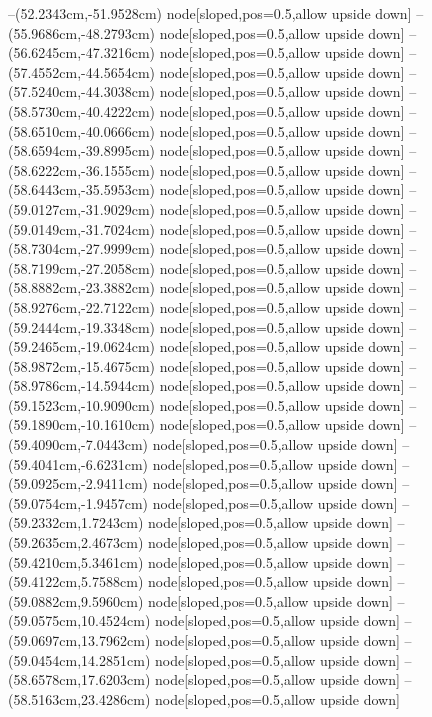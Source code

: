 --(52.2343cm,-51.9528cm) node[sloped,pos=0.5,allow upside down]{\ArrowIn}
--(55.9686cm,-48.2793cm) node[sloped,pos=0.5,allow upside down]{\ArrowIn}
--(56.6245cm,-47.3216cm) node[sloped,pos=0.5,allow upside down]{\ArrowIn}
--(57.4552cm,-44.5654cm) node[sloped,pos=0.5,allow upside down]{\ArrowIn}
--(57.5240cm,-44.3038cm) node[sloped,pos=0.5,allow upside down]{\arrowIn}
--(58.5730cm,-40.4222cm) node[sloped,pos=0.5,allow upside down]{\ArrowIn}
--(58.6510cm,-40.0666cm) node[sloped,pos=0.5,allow upside down]{\arrowIn}
--(58.6594cm,-39.8995cm) node[sloped,pos=0.5,allow upside down]{\arrowIn}
--(58.6222cm,-36.1555cm) node[sloped,pos=0.5,allow upside down]{\ArrowIn}
--(58.6443cm,-35.5953cm) node[sloped,pos=0.5,allow upside down]{\arrowIn}
--(59.0127cm,-31.9029cm) node[sloped,pos=0.5,allow upside down]{\ArrowIn}
--(59.0149cm,-31.7024cm) node[sloped,pos=0.5,allow upside down]{\arrowIn}
--(58.7304cm,-27.9999cm) node[sloped,pos=0.5,allow upside down]{\ArrowIn}
--(58.7199cm,-27.2058cm) node[sloped,pos=0.5,allow upside down]{\arrowIn}
--(58.8882cm,-23.3882cm) node[sloped,pos=0.5,allow upside down]{\ArrowIn}
--(58.9276cm,-22.7122cm) node[sloped,pos=0.5,allow upside down]{\arrowIn}
--(59.2444cm,-19.3348cm) node[sloped,pos=0.5,allow upside down]{\ArrowIn}
--(59.2465cm,-19.0624cm) node[sloped,pos=0.5,allow upside down]{\arrowIn}
--(58.9872cm,-15.4675cm) node[sloped,pos=0.5,allow upside down]{\ArrowIn}
--(58.9786cm,-14.5944cm) node[sloped,pos=0.5,allow upside down]{\arrowIn}
--(59.1523cm,-10.9090cm) node[sloped,pos=0.5,allow upside down]{\ArrowIn}
--(59.1890cm,-10.1610cm) node[sloped,pos=0.5,allow upside down]{\arrowIn}
--(59.4090cm,-7.0443cm) node[sloped,pos=0.5,allow upside down]{\ArrowIn}
--(59.4041cm,-6.6231cm) node[sloped,pos=0.5,allow upside down]{\arrowIn}
--(59.0925cm,-2.9411cm) node[sloped,pos=0.5,allow upside down]{\ArrowIn}
--(59.0754cm,-1.9457cm) node[sloped,pos=0.5,allow upside down]{\arrowIn}
--(59.2332cm,1.7243cm) node[sloped,pos=0.5,allow upside down]{\ArrowIn}
--(59.2635cm,2.4673cm) node[sloped,pos=0.5,allow upside down]{\arrowIn}
--(59.4210cm,5.3461cm) node[sloped,pos=0.5,allow upside down]{\ArrowIn}
--(59.4122cm,5.7588cm) node[sloped,pos=0.5,allow upside down]{\arrowIn}
--(59.0882cm,9.5960cm) node[sloped,pos=0.5,allow upside down]{\ArrowIn}
--(59.0575cm,10.4524cm) node[sloped,pos=0.5,allow upside down]{\arrowIn}
--(59.0697cm,13.7962cm) node[sloped,pos=0.5,allow upside down]{\ArrowIn}
--(59.0454cm,14.2851cm) node[sloped,pos=0.5,allow upside down]{\arrowIn}
--(58.6578cm,17.6203cm) node[sloped,pos=0.5,allow upside down]{\ArrowIn}
--(58.5163cm,23.4286cm) node[sloped,pos=0.5,allow upside down]{\ArrowIn}
